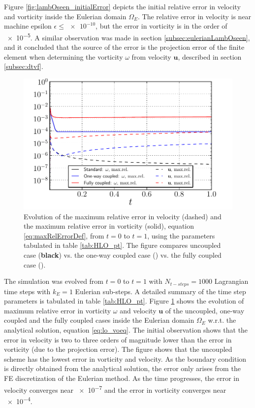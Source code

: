 Figure \ref{fig:lambOseen_initialError} depicts the initial relative error in velocity and vorticity inside the Eulerian domain $\Omega_E$. The relative error in velocity is near machine epsilon $\epsilon \le \num{e-10}$, but the error in vorticity is in the order of \num{e-5}. A similar observation was made in section \ref{subsec:eulerianLambOseen}, and it concluded that the source of the error is the projection error of the finite element when determining the vorticity $\omega$ from velocity $\mathbf{u}$, described in section \ref{subsec:dtvf}. 

	\begin{figure}[!b]
	\centering
	\includegraphics[width=0.6\linewidth]{./figures/validation/lambOseen/lambOseen_comparision_compressed.pdf}
	\caption{Evolution of the maximum relative error in velocity (dashed) and the maximum relative error in vorticity (solid), equation \ref{eq:maxRelErrorDef}, from $t=0$ to $t=1$, using the parameters tabulated in table \ref{tab:HLO_pt}. The figure compares uncoupled case (\textbf{black}) vs. the one-way coupled case ({}) vs. the fully coupled case ({}).}
	\label{fig:lambOseen_comparison}
	\end{figure}

The simulation was evolved from $t=0$ to $t=1$ with $N_{t-steps} = 1000$ Lagrangian time steps with $k_E=1$ Eulerian sub-steps. A detailed summary of the time step parameters is tabulated in table \ref{tab:HLO_pt}. Figure \ref{fig:lambOseen_comparison} shows the evolution of maximum relative error in vorticity $\omega$ and velocity $\mathbf{u}$ of the uncoupled, one-way coupled and the fully coupled cases inside the Eulerian domain $\Omega_E$ w.r.t. the analytical solution, equation \ref{eq:lo_voeq}. The initial observation shows that the error in velocity is two to three orders of magnitude lower than the error in vorticity (due to the projection error). The figure shows that the uncoupled scheme has the lowest error in vorticity and velocity. As the boundary condition is directly obtained from the analytical solution, the error only arises from the FE discretization of the Eulerian method. As the time progresses, the error in velocity converges near \num{e-7} and the error in vorticity converges near \num{e-4}.

